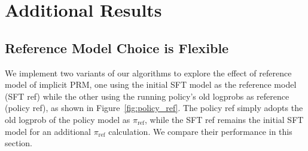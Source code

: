 






\section{Additional Results}\label{sec:app_results}


\subsection{Reference Model Choice is Flexible} 






We implement two variants of our algorithms to explore the effect of reference model of implicit PRM, one using the initial SFT model as the reference model (SFT ref) while the other using the running policy's old logprobs as reference (policy ref), as shown in Figure~\ref{fig:policy_ref}. The policy ref simply adopts the old logprob of the policy model as  $\pi_{\text{ref}}$, while the SFT ref remains the initial SFT model for an additional $\pi_{\text{ref}}$ calculation. We compare their performance in this section. 

